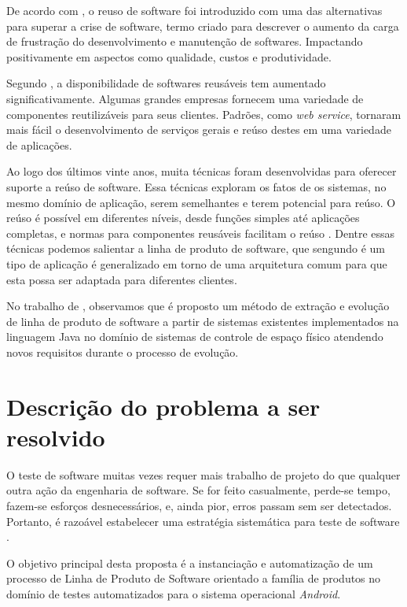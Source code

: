 \documentclass[12pt,a4paper]{article}
\begin{document}
De acordo com \cite{sametinger1997}, o reuso de software foi introduzido com uma das alternativas para superar a crise de software, termo criado para descrever o aumento da carga de frustração do desenvolvimento e manutenção de softwares. Impactando positivamente em aspectos como qualidade, custos e produtividade.

Segundo \cite{Sommerville2011}, a disponibilidade de softwares reusáveis tem aumentado significativamente. Algumas grandes empresas fornecem uma variedade de componentes reutilizáveis para seus clientes. Padrões, como \textit{web service}, tornaram mais fácil o desenvolvimento de serviços gerais e reúso destes em uma variedade de aplicações.

Ao logo dos últimos vinte anos, muita técnicas foram desenvolvidas para oferecer suporte a reúso de software. Essa técnicas exploram os fatos de os sistemas, no mesmo domínio de aplicação, serem semelhantes e terem potencial para reúso. O reúso é possível em diferentes níveis, desde funções simples até aplicações completas, e normas para componentes reusáveis facilitam o reúso \cite{Sommerville2011}. Dentre essas técnicas podemos salientar a linha de produto de software, que sengundo \cite{Sommerville2011} é um tipo de aplicação é generalizado em torno de uma arquitetura comum para que esta possa ser adaptada para diferentes clientes.

No trabalho de \cite{pontes2017}, observamos que é proposto um método de extração e evolução de linha de produto de software a partir de sistemas existentes implementados na linguagem Java no domínio de sistemas de controle de espaço físico atendendo novos requisitos durante o processo de evolução.


\section{Descrição do problema a ser resolvido}
O teste de software muitas vezes requer mais trabalho de projeto do que qualquer outra ação da engenharia de software. Se for feito casualmente, perde-se tempo, fazem-se esforços desnecessários, e, ainda pior, erros passam sem ser detectados. Portanto, é razoável estabelecer uma estratégia sistemática para teste de software \cite{pressman2011}.

O objetivo principal desta proposta é a instanciação e automatização de um processo de Linha de Produto de Software orientado a família de produtos no domínio de testes automatizados para o sistema operacional \textit{Android}.
\end{document}
